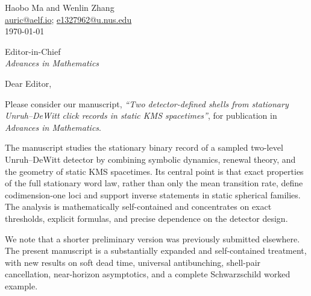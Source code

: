 \documentclass[11pt]{article}
\begin{document}
\begin{flushright}
Haobo Ma and Wenlin Zhang\\
\href{mailto:auric@aelf.io}{auric@aelf.io}; \href{mailto:e1327962@u.nus.edu}{e1327962@u.nus.edu}\\
\today
\end{flushright}

Editor-in-Chief\\
\emph{Advances in Mathematics}

Dear Editor,

Please consider our manuscript, \emph{``Two detector-defined shells from stationary Unruh--DeWitt click records in static KMS spacetimes''}, for publication in \emph{Advances in Mathematics}.

The manuscript studies the stationary binary record of a sampled two-level Unruh--DeWitt detector by combining symbolic dynamics, renewal theory, and the geometry of static KMS spacetimes. Its central point is that exact properties of the full stationary word law, rather than only the mean transition rate, define codimension-one loci and support inverse statements in static spherical families. The analysis is mathematically self-contained and concentrates on exact thresholds, explicit formulas, and precise dependence on the detector design.

We note that a shorter preliminary version was previously submitted elsewhere. The present manuscript is a substantially expanded and self-contained treatment, with new results on soft dead time, universal antibunching, shell-pair cancellation, near-horizon asymptotics, and a complete Schwarzschild worked example.
\end{document}
